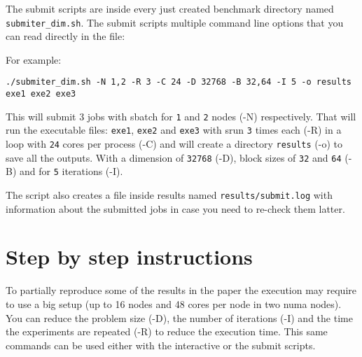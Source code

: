 \documentclass{article}
\newcommand{\code}[1]{\texttt{#1}}
\begin{document}
The submit scripts are inside every just created benchmark directory
named \code{submiter\_dim.sh}. The submit scripts multiple command line
options that you can read directly in the file:

For example:

\begin{lstlisting}
./submiter_dim.sh -N 1,2 -R 3 -C 24 -D 32768 -B 32,64 -I 5 -o results exe1 exe2 exe3
\end{lstlisting}

This will submit 3 jobs with sbatch for \code{1} and \code{2} nodes
(-N) respectively. That will run the executable files: \code{exe1},
\code{exe2} and \code{exe3} with srun \code{3} times each (-R) in a
loop with \code{24} cores per process (-C) and will create a directory
\code{results} (-o) to save all the outputs. With a dimension of
\code{32768} (-D), block sizes of \code{32} and \code{64} (-B) and for
\code{5} iterations (-I).

The script also creates a file inside results named
\code{results/submit.log} with information about the submitted jobs in
case you need to re-check them latter.

\section{Step by step instructions}

To partially reproduce some of the results in the paper the execution
may require to use a big setup (up to 16 nodes and 48 cores per node
in two numa nodes). You can reduce the problem size (-D), the number
of iterations (-I) and the time the experiments are repeated (-R) to
reduce the execution time. This same commands can be used either with
the interactive or the submit scripts.
\end{document}
